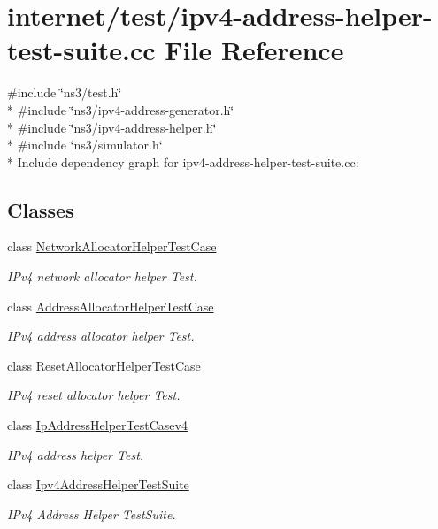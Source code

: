\hypertarget{ipv4-address-helper-test-suite_8cc}{}\section{internet/test/ipv4-\/address-\/helper-\/test-\/suite.cc File Reference}
\label{ipv4-address-helper-test-suite_8cc}
{\ttfamily \#include \char`\"{}ns3/test.\+h\char`\"{}}\\*
{\ttfamily \#include \char`\"{}ns3/ipv4-\/address-\/generator.\+h\char`\"{}}\\*
{\ttfamily \#include \char`\"{}ns3/ipv4-\/address-\/helper.\+h\char`\"{}}\\*
{\ttfamily \#include \char`\"{}ns3/simulator.\+h\char`\"{}}\\*
Include dependency graph for ipv4-\/address-\/helper-\/test-\/suite.cc\+:
\subsection*{Classes}
\begin{DoxyCompactItemize}
\item 
class \hyperlink{classNetworkAllocatorHelperTestCase}{Network\+Allocator\+Helper\+Test\+Case}
\begin{DoxyCompactList}\small\item\em I\+Pv4 network allocator helper Test. \end{DoxyCompactList}\item 
class \hyperlink{classAddressAllocatorHelperTestCase}{Address\+Allocator\+Helper\+Test\+Case}
\begin{DoxyCompactList}\small\item\em I\+Pv4 address allocator helper Test. \end{DoxyCompactList}\item 
class \hyperlink{classResetAllocatorHelperTestCase}{Reset\+Allocator\+Helper\+Test\+Case}
\begin{DoxyCompactList}\small\item\em I\+Pv4 reset allocator helper Test. \end{DoxyCompactList}\item 
class \hyperlink{classIpAddressHelperTestCasev4}{Ip\+Address\+Helper\+Test\+Casev4}
\begin{DoxyCompactList}\small\item\em I\+Pv4 address helper Test. \end{DoxyCompactList}\item 
class \hyperlink{classIpv4AddressHelperTestSuite}{Ipv4\+Address\+Helper\+Test\+Suite}
\begin{DoxyCompactList}\small\item\em I\+Pv4 Address Helper Test\+Suite. \end{DoxyCompactList}\end{DoxyCompactItemize}

